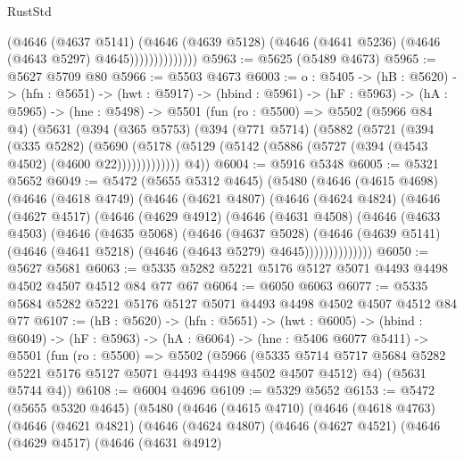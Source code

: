 \begin{lexlean}{RustStd}
\begin{coremodule}
                        (@4646
                          (@4637 @5141)
                          (@4646
                            (@4639 @5128)
                            (@4646 (@4641 @5236) (@4646 (@4643 @5297) @4645))))))))))))))
@5963 := @5625 (@5489 @4673)
@5965 := @5627 @5709 @80
@5966 := @5503 @4673
@6003 := {o : @5405} ->
  (hB : @5620) ->
  (hfn : @5651) ->
  (hwt : @5917) ->
  (hbind : @5961) ->
  (hF : @5963) ->
  (hA : @5965) ->
  (hne : @5498) ->
  @5501
    (fun (ro : @5500) =>
    @5502
      (@5966 @84 @4)
      (@5631
        (@394
          (@365 @5753)
          (@394
            (@771 @5714)
            (@5882
              (@5721
                (@394
                  (@335 @5282)
                  (@5690
                    (@5178 (@5129 (@5142 (@5886 (@5727 (@394 (@4543 @4502) (@4600 @22)))))))))))))
        @4))
@6004 := @5916 @5348
@6005 := @5321 @5652
@6049 := @5472
    (@5655 @5312 @4645)
    (@5480
      (@4646
        (@4615 @4698)
        (@4646
          (@4618 @4749)
          (@4646
            (@4621 @4807)
            (@4646
              (@4624 @4824)
              (@4646
                (@4627 @4517)
                (@4646
                  (@4629 @4912)
                  (@4646
                    (@4631 @4508)
                    (@4646
                      (@4633 @4503)
                      (@4646
                        (@4635 @5068)
                        (@4646
                          (@4637 @5028)
                          (@4646
                            (@4639 @5141)
                            (@4646 (@4641 @5218) (@4646 (@4643 @5279) @4645))))))))))))))
@6050 := @5627 @5681
@6063 := @5335 @5282 @5221 @5176 @5127 @5071 @4493 @4498 @4502 @4507 @4512 @84 @77 @67
@6064 := @6050 @6063
@6077 := @5335 @5684 @5282 @5221 @5176 @5127 @5071 @4493 @4498 @4502 @4507 @4512 @84 @77
@6107 := (hB : @5620) ->
  (hfn : @5651) ->
  (hwt : @6005) ->
  (hbind : @6049) ->
  (hF : @5963) ->
  (hA : @6064) ->
  (hne : @5406 @6077 @5411) ->
  @5501
    (fun (ro : @5500) =>
    @5502
      (@5966
        (@5335 @5714 @5717 @5684 @5282 @5221 @5176 @5127 @5071 @4493 @4498 @4502 @4507 @4512)
        @4)
      (@5631 @5744 @4))
@6108 := @6004 @4696
@6109 := @5329 @5652
@6153 := @5472
    (@5655 @5320 @4645)
    (@5480
      (@4646
        (@4615 @4710)
        (@4646
          (@4618 @4763)
          (@4646
            (@4621 @4821)
            (@4646
              (@4624 @4807)
              (@4646
                (@4627 @4521)
                (@4646
                  (@4629 @4517)
                  (@4646
                    (@4631 @4912)

\end{coremodule}
\end{lexlean}
